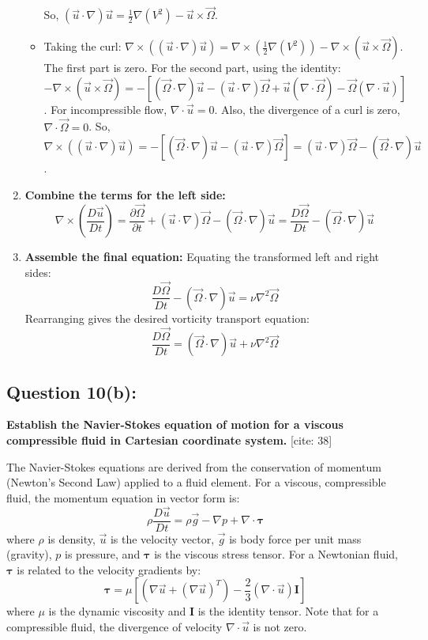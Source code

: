 \documentclass{article}
\begin{document}
\begin{enumerate}
\begin{itemize}
        So, $(\vec{u} \cdot \nabla)\vec{u} = \frac{1}{2}\nabla(V^2) - \vec{u} \times \vec{\Omega}$.
        \item Taking the curl: $\nabla \times ((\vec{u} \cdot \nabla)\vec{u}) = \nabla \times (\frac{1}{2}\nabla(V^2)) - \nabla \times (\vec{u} \times \vec{\Omega})$.
        The first part is zero. For the second part, using the identity:
        $- \nabla \times (\vec{u} \times \vec{\Omega}) = -[(\vec{\Omega}\cdot\nabla)\vec{u} - (\vec{u}\cdot\nabla)\vec{\Omega} + \vec{u}(\nabla\cdot\vec{\Omega}) - \vec{\Omega}(\nabla\cdot\vec{u})]$.
        For incompressible flow, $\nabla \cdot \vec{u} = 0$. Also, the divergence of a curl is zero, $\nabla \cdot \vec{\Omega} = 0$.
        So, $\nabla \times ((\vec{u} \cdot \nabla)\vec{u}) = -[(\vec{\Omega}\cdot\nabla)\vec{u} - (\vec{u}\cdot\nabla)\vec{\Omega}] = (\vec{u}\cdot\nabla)\vec{\Omega} - (\vec{\Omega}\cdot\nabla)\vec{u}$.
    \end{itemize}
    \item \textbf{Combine the terms for the left side:}
    $$ \nabla \times \left(\frac{D\vec{u}}{Dt}\right) = \frac{\partial \vec{\Omega}}{\partial t} + (\vec{u}\cdot\nabla)\vec{\Omega} - (\vec{\Omega}\cdot\nabla)\vec{u} = \frac{D\vec{\Omega}}{Dt} - (\vec{\Omega}\cdot\nabla)\vec{u} $$
    \item \textbf{Assemble the final equation:}
    Equating the transformed left and right sides:
    $$ \frac{D\vec{\Omega}}{Dt} - (\vec{\Omega}\cdot\nabla)\vec{u} = \nu \nabla^2 \vec{\Omega} $$
    Rearranging gives the desired vorticity transport equation:
    $$ \frac{D\vec{\Omega}}{Dt} = (\vec{\Omega}\cdot\nabla)\vec{u} + \nu\nabla^{2}\vec{\Omega} $$
\end{enumerate}
\hrulefill

\subsection*{\textbf{Question 10(b):}}
\textbf{Establish the Navier-Stokes equation of motion for a viscous compressible fluid in Cartesian coordinate system.} [cite: 38]

The Navier-Stokes equations are derived from the conservation of momentum (Newton's Second Law) applied to a fluid element. For a viscous, compressible fluid, the momentum equation in vector form is:
$$ \rho \frac{D\vec{u}}{Dt} = \rho \vec{g} - \nabla p + \nabla \cdot \boldsymbol{\tau} $$
where $\rho$ is density, $\vec{u}$ is the velocity vector, $\vec{g}$ is body force per unit mass (gravity), $p$ is pressure, and $\boldsymbol{\tau}$ is the viscous stress tensor. For a Newtonian fluid, $\boldsymbol{\tau}$ is related to the velocity gradients by:
$$ \boldsymbol{\tau} = \mu \left[ (\nabla \vec{u} + (\nabla \vec{u})^T) - \frac{2}{3}(\nabla \cdot \vec{u})\mathbf{I} \right] $$
where $\mu$ is the dynamic viscosity and $\mathbf{I}$ is the identity tensor. Note that for a compressible fluid, the divergence of velocity $\nabla \cdot \vec{u}$ is not zero.
\end{document}
